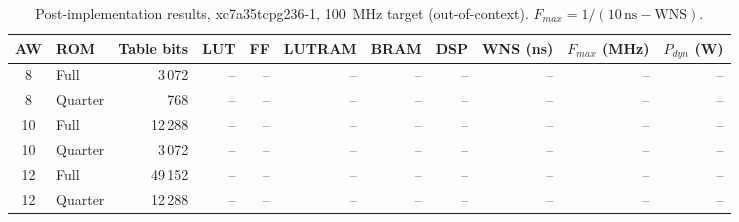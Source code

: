 \begin{table}[t]
\caption{Post-implementation results, xc7a35tcpg236-1, 100~MHz target (out-of-context). $F_{max}=1/(10\,\mathrm{ns}-\mathrm{WNS})$.}
\label{tab:res}
\centering
\small
\begin{tabular}{@{}clrrrrrrrrr@{}}
\toprule
AW & ROM & Table bits & LUT & FF & LUTRAM & BRAM & DSP & WNS (ns) & $F_{max}$ (MHz) & $P_{dyn}$ (W)\\
\midrule
8 & Full & 3\,072 & -- & -- & -- & -- & -- & -- & -- & --\\
8 & Quarter & 768 & -- & -- & -- & -- & -- & -- & -- & --\\
10 & Full & 12\,288 & -- & -- & -- & -- & -- & -- & -- & --\\
10 & Quarter & 3\,072 & -- & -- & -- & -- & -- & -- & -- & --\\
12 & Full & 49\,152 & -- & -- & -- & -- & -- & -- & -- & --\\
12 & Quarter & 12\,288 & -- & -- & -- & -- & -- & -- & -- & --\\
\bottomrule
\end{tabular}
\end{table}
